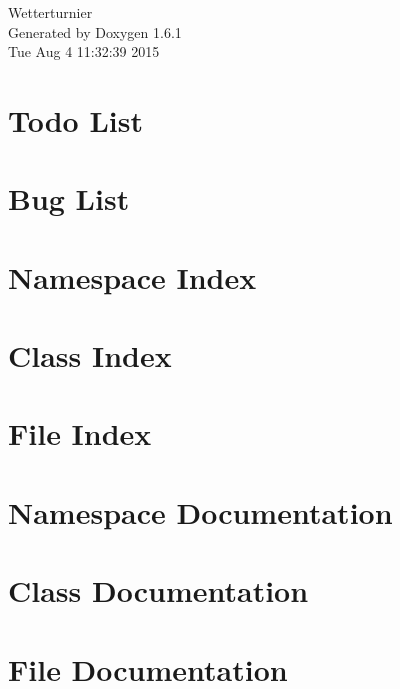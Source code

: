 \documentclass[a4paper]{article}
\begin{document}
\hypersetup{pageanchor=false}
\begin{titlepage}
\vspace*{7cm}
\begin{center}
{\Large Wetterturnier }\\
\vspace*{1cm}
{\large Generated by Doxygen 1.6.1}\\
\vspace*{0.5cm}
{\small Tue Aug 4 11:32:39 2015}\\
\end{center}
\end{titlepage}
\tableofcontents
{}
\hypersetup{pageanchor=true}
\section{Todo List}
\label{todo}
\hypertarget{todo}{}

\section{Bug List}
\label{bug}
\hypertarget{bug}{}

\section{Namespace Index}

\section{Class Index}

\section{File Index}

\section{Namespace Documentation}











\section{Class Documentation}







\section{File Documentation}











\printindex
\end{document}
